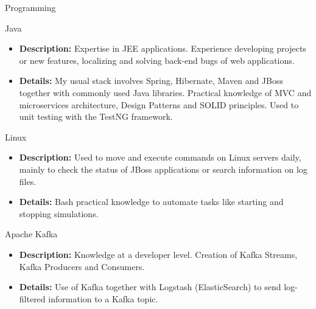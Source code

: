 \documentclass[a4paper,10pt]{article}
\newlength{\cvcolumngapwidth}
\newlength{\cvleftcolumnwidth}
\newlength{\cvrightcolumnwidth}
\newcommand{\cvheadingstyle}[1]{{\normalsize\cvheadingfont\textcolor{cvheadingcolor}{#1}}}
\newlength{\cvafteritemskipamount}
\newlength{\cvparskip}
\newcommand{\cvitem}[2]{
    \begin{minipage}[t]{\cvleftcolumnwidth}
        \raggedleft #1
    \end{minipage}%
    \hspace{\cvcolumngapwidth}%
    \begin{minipage}[t]{\cvrightcolumnwidth}
        \setlength{\parskip}{\cvparskip} #2
    \end{minipage}

    \vspace{\cvafteritemskipamount}
}
\begin{document}
\cvitem{
    \cvheadingstyle{Programming}
}{

    
     
    Java
    \begin{itemize}
       \item \textbf{Description:} Expertise in JEE applications. Experience developing projects or new features, localizing and solving back-end bugs of web applications.
        \item \textbf{Details:} My usual stack involves Spring, Hibernate, Maven and JBoss together with commonly used Java libraries. Practical knowledge of MVC and microservices architecture, Design Patterns and SOLID principles. Used to unit testing with the TestNG framework.
    \end{itemize}
    
    \vspace{10pt}

    Linux
    \begin{itemize}
       \item \textbf{Description:} Used to move and execute commands on Linux servers daily, mainly to check the status of JBoss applications or search information on log files.
        \item \textbf{Details:} Bash practical knowledge to automate tasks like starting and stopping simulations.
    \end{itemize}
    
    \vspace{10pt}

    Apache Kafka
    \begin{itemize}
       \item \textbf{Description:} Knowledge at a developer level. Creation of Kafka Streams, Kafka Producers and Consumers.
        \item \textbf{Details:} Use of Kafka together with Logstash (ElasticSearch) to send log-filtered information to a Kafka topic.
    \end{itemize}
    
}
\end{document}

